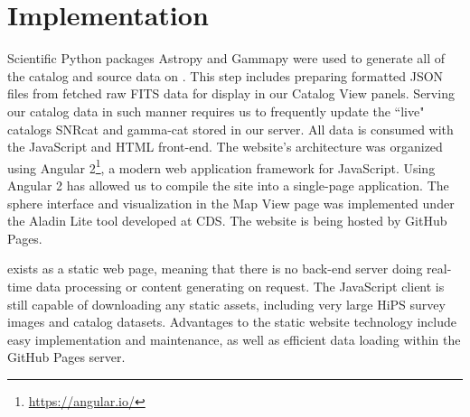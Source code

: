 \section{Implementation}

Scientific Python packages Astropy \cite{astropy} and Gammapy were used to generate all of the catalog and source data on \gammasky. This step includes preparing formatted JSON files from fetched raw FITS data for display in our Catalog View panels. Serving our catalog data in such manner requires us to frequently update the ``live" catalogs SNRcat and gamma-cat stored in our server. All data is consumed with the JavaScript and HTML front-end. The website's architecture was organized using Angular 2\footnote[5]{\url{https://angular.io/}}, a modern web application framework for JavaScript. Using Angular 2 has allowed us to compile the site into a single-page application. The sphere interface and visualization in the Map View page was implemented under the Aladin Lite tool \cite{aladin-lite} developed at CDS. The website is being hosted by GitHub Pages.


\gammasky exists as a static web page, meaning that there is no back-end server doing real-time data processing or content generating on request. The JavaScript client is still capable of downloading any static assets, including very large HiPS survey images and catalog datasets. Advantages to the static website technology include easy implementation and maintenance, as well as efficient data loading within the GitHub Pages server.
